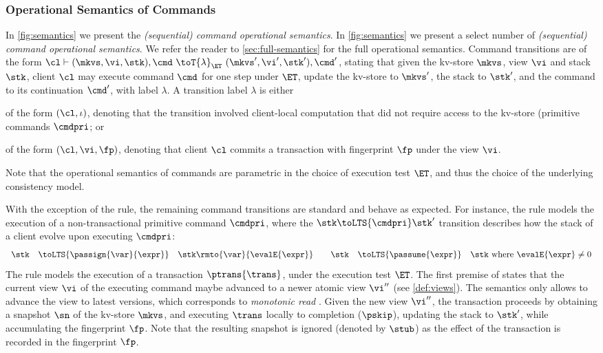 \subsubsection{Operational Semantics of Commands}
\ifTechReport%
In \cref{fig:semantics} we present the \emph{(sequential) command operational semantics}.
\else%
In \cref{fig:semantics} we present a select number of \emph{(sequential) command operational semantics}.
We refer the reader to \cref{sec:full-semantics} for the full operational semantics.
\fi%
Command transitions are of the form $\cl \vdash (\mkvs, \vi, \stk), \cmd \ \toT{\lambda}_{\ET} \ (\mkvs', \vi', \stk') , \cmd'$, 
stating that given the kv-store $\mkvs$, view $\vi$ and stack $\stk$, client $\cl$ may execute command $\cmd$ for one step under $\ET$, update the kv-store to $\mkvs'$, the stack to $\stk'$, and the command to its continuation $\cmd'$, with label $\lambda$.
A transition label $\lambda$ is either
\begin{enumerate*}
	\item of the form $(\cl, \iota)$, denoting that the transition involved 
client-local computation that did not require access to the kv-store (\eg primitive commands $\cmdpri$; or
	\item of the form $(\cl, \vi, \fp)$, denoting that client $\cl$ commits a transaction with fingerprint $\fp$ under the view $\vi$.
\end{enumerate*}
Note that the operational semantics of commands are parametric in the choice of execution test $\ET$, 
and thus the choice of the underlying consistency model.


With the exception of the  rule, the remaining command transitions are standard and behave as expected. 
For instance, the  rule models the execution of a non-transactional primitive command $\cmdpri$, where the $\stk \toLTS{\cmdpri} \stk'$ transition describes how the stack of a client 
evolve upon executing $\cmdpri$:
\[
\begin{array}{rcl @{\qquad} rcl}
\stk  & \toLTS{\passign{\var}{\expr}} & \stk\rmto{\var}{\evalE{\expr}} &
\stk  & \toLTS{\passume{\expr}} & \stk \text{ where } \evalE{\expr} \neq 0 \\
\end{array}                                                                                               
\]
%
%
The  rule models the execution of a transaction $\ptrans{\trans}$, under the execution test $\ET$. 
The first premise of  states that the current view $\vi$ of the executing command maybe advanced to a newer atomic view $\vi''$ (see \cref{def:views}). 
The semantics only allows to advance the view to latest versions, which corresponds to \emph{monotonic read} \cite{.......}.
Given the new view $\vi''$, the transaction proceeds by obtaining a snapshot $\sn$ of the kv-store $\mkvs$, and executing $\trans$ locally to completion ($\pskip$), updating the stack to $\stk'$, while accumulating the fingerprint $\fp$. Note that the resulting snapshot is ignored (denoted by $\stub$) as the effect of the transaction is recorded in the fingerprint $\fp$. 
%

